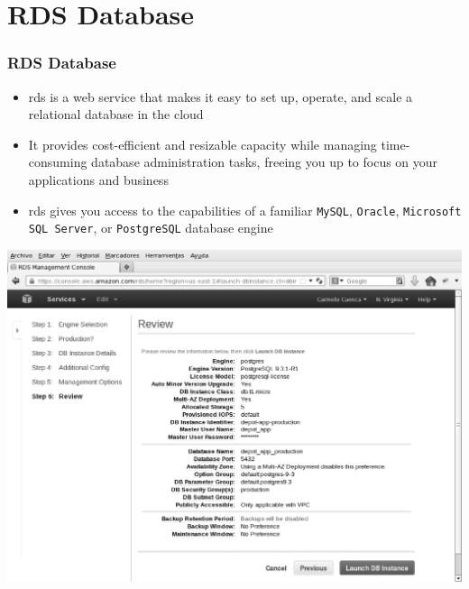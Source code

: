 \documentclass{beamer}
\begin{document}
\section{RDS Database}
\begin{frame}
\frametitle{RDS Database}
\begin{itemize}
 \item \acrfull{rds} is a web service that makes it easy to set up, operate, and scale a relational database in the cloud
 \item It provides cost-efficient and resizable capacity while managing time-consuming database administration tasks, freeing you up to focus on your applications and business
 \item \acrshort{rds} gives you access to the capabilities of a familiar \texttt{MySQL}, \texttt{Oracle}, \texttt{Microsoft SQL Server}, or \texttt{PostgreSQL} database engine
\end{itemize}
\begin{center}

\includegraphics[scale=0.25]{rds.eps}
\end{center}
\end{frame}
\end{document}
